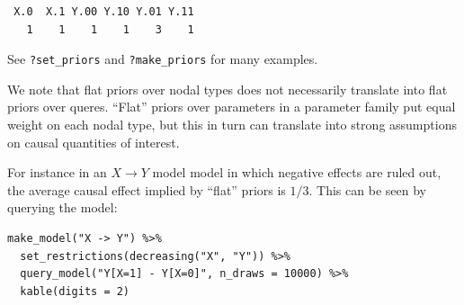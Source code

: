 \documentclass[
  article]{jss}
\begin{document}
\begin{verbatim}
 X.0  X.1 Y.00 Y.10 Y.01 Y.11 
   1    1    1    1    3    1 
\end{verbatim}

See \texttt{?set\_priors} and \texttt{?make\_priors} for many examples.

We note that flat priors over nodal types does not necessarily translate
into flat priors over queres. ``Flat'' priors over parameters in a
parameter family put equal weight on each nodal type, but this in turn
can translate into strong assumptions on causal quantities of interest.

For instance in an \(X \rightarrow Y\) model model in which negative
effects are ruled out, the average causal effect implied by ``flat''
priors is \(1/3\). This can be seen by querying the model:

\begin{verbatim}
make_model("X -> Y") %>%
  set_restrictions(decreasing("X", "Y")) %>%
  query_model("Y[X=1] - Y[X=0]", n_draws = 10000) %>%
  kable(digits = 2)
\end{verbatim}
\end{document}
